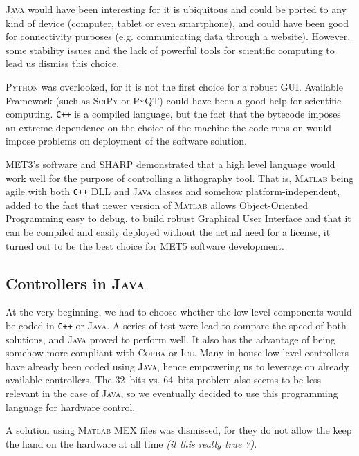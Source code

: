\documentclass[10pt,letter,twoside]{report}
\newcommand{\comment}[1] {{\it (#1)}}
\begin{document}
\textsc{Java} would have been interesting for it is ubiquitous and could be ported to any kind of device (computer, tablet or even smartphone), and could have been good for connectivity purposes (e.g. communicating data through a website). 
However, some stability issues and the lack of powerful tools for scientific computing to lead us dismiss this choice.

\textsc{Python} was overlooked, for it is not the first choice for a robust GUI. Available Framework (such as \textsc{SciPy} or \textsc{PyQT}) could have been a good help for scientific computing.
\verb!C++! is a compiled language, but the fact that the bytecode imposes an extreme dependence on the choice of the machine the code runs on would impose problems on deployment of the software solution.

MET3's software and SHARP demonstrated that a high level language would work well for the purpose of controlling a lithography tool. 
That is, \textsc{Matlab} being agile with both \verb!C++! DLL and \textsc{Java} classes and somehow platform-independent, added to the fact that newer version of \textsc{Matlab} allows Object-Oriented Programming easy to debug, to build robust Graphical User Interface and that it can be compiled and easily deployed without the actual need for a license, it turned out to be the best choice for MET5 software development.

\subsection{Controllers in \textsc{Java}}
At the very beginning, we had to choose whether the low-level components would be coded in \verb!C++! or \textsc{Java}.
A series of test were lead to compare the speed of both solutions, and \textsc{Java} proved to perform well. 
It also has the advantage of being somehow more compliant with \textsc{Corba} or \textsc{Ice}. 
Many in-house low-level controllers have already been coded using \textsc{Java}, hence empowering us to leverage on already available controllers.
The 32~bits vs. 64~bits problem also seems to be less relevant in the case of \textsc{Java}, so we eventually decided to use this programming language for hardware control.

A solution using \textsc{Matlab} MEX files was dismissed, for they do not allow the keep the hand on the hardware at all time \comment{it this really true ?}.
\end{document}
